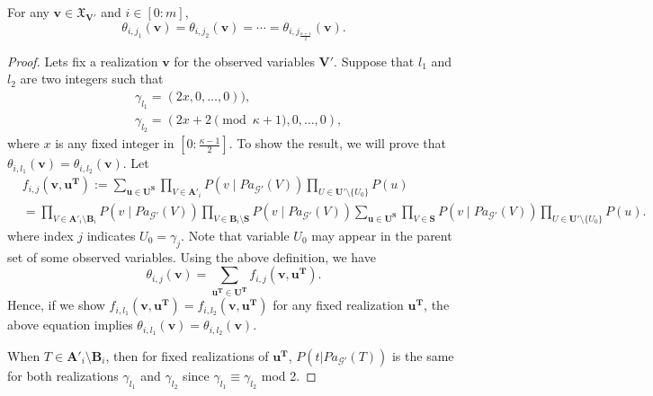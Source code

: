 \documentclass[accepted]{uai2022}
\newenvironment{customlem}[1]{\renewcommand\thelemma{#1}\lemma}{\endlemma}
\newcommand{\Pa}[2]{\textit{Pa}_{#2}(#1)}
\newcommand{\V}[0]{\mathbf{V}}
\newcommand{\U}[0]{\mathbf{U}}
\newcommand{\A}[0]{\mathbf{A}}
\newcommand{\B}[0]{\mathbf{B}}
\newcommand{\T}[0]{\mathbf{T}}
\newcommand{\G}[0]{\mathcal{G}}
\newcommand{\dom}[1]{\mathfrak{X}_{#1}}
\begin{document}
   \begin{customlem}{\ref{lem: theta index}}
        For any $\mathbf{v} \in \dom{\V'}$ and $i\in[0:m]$,
        \begin{equation*}
            \theta_{i,j_1}(\mathbf{v}) = \theta_{i,j_2}(\mathbf{v}) = \cdots= \theta_{i,j_{\frac{\kappa+1}{2}}}(\mathbf{v}).
        \end{equation*}
    \end{customlem}
    \begin{proof}
        Lets fix a realization $\mathbf{v}$ for the observed variables $\V'$.
        Suppose that $l_1$ and $l_2$ are two integers such that
        \begin{equation*}
        \begin{split}
            & \gamma_{l_1} = (2x, 0, \dots, 0)),\\
            & \gamma_{l_2} = (2x+2 \pmod{\kappa+1}, 0, \dots, 0),
        \end{split}
        \end{equation*}
        where $x$ is any fixed integer in $[0 : \frac{\kappa-1}{2}]$.
        To show the result, we will prove that $\theta_{i, l_1}(\mathbf{v})=\theta_{i, l_2}(\mathbf{v})$. Let
        \begin{align*}
            &f_{i, j}(\mathbf{v}, \mathbf{u}^{\mathbf{T}}) := \sum_{\mathbf{u}\in\U^{\mathbf{S}}} \prod_{V \in \A'_i} P(v \mid \Pa{V}{\G'})\! \prod_{U\in \U' \setminus \{U_0\}}\! P(u)\\
            & = \prod_{V \in \A'_i\setminus\B_i} P(v \mid \Pa{V}{\G'})\! \prod_{V \in \B_i\setminus\mathbf{S}} P(v \mid \Pa{V}{\G'})\!\sum_{\mathbf{u}\in\U^{\mathbf{S}}}\prod_{V \in \mathbf{S}} P(v \mid \Pa{V}{\G'}) \prod_{U\in \U' \setminus \{U_0\}}\! P(u). 
        \end{align*}
        where index $j$ indicates $U_0=\gamma_j$. Note that variable $U_0$ may appear in the parent set of some observed variables. 
        Using the above definition, we have
        \begin{equation*}
            \theta_{i, j}(\mathbf{v}) = \sum_{\mathbf{u}^\textbf{T}\in\U^{\T}} f_{i, j}(\mathbf{v}, \mathbf{u}^{\mathbf{T}}).
        \end{equation*}
        Hence, if we show $f_{i, l_1}(\mathbf{v}, \mathbf{u}^{\mathbf{T}})=f_{i, l_2}(\mathbf{v}, \mathbf{u}^{\mathbf{T}})$ for any fixed realization $\mathbf{u}^{\T}$, the above equation implies $\theta_{i, l_1}(\mathbf{v})=\theta_{i, l_2}(\mathbf{v})$. 
        
        When $T\in \A'_i\setminus\B_i$, then for fixed realizations of $\textbf{u}^{\T}$,  $P(t|\Pa{T}{\G'})$ is the same for both realizations $\gamma_{l_1}$ and $\gamma_{l_2}$ since $\gamma_{l_1}\equiv\gamma_{l_2}$ mod 2.
        

\end{proof}
\end{document}
